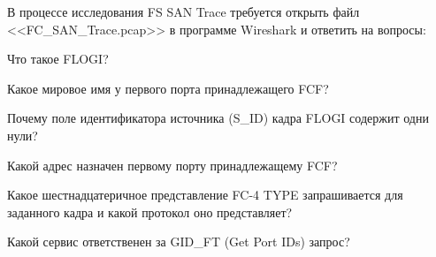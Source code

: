 
В процессе исследования FS SAN Trace требуется открыть файл
<<FC\_SAN\_Trace.pcap>> в программе Wireshark и ответить на вопросы:


\begin{enumerate_num}
    \item Что такое FLOGI?
    \item Какое мировое имя у первого порта принадлежащего FCF?
    \item Почему поле идентификатора источника (S\_ID) кадра FLOGI содержит
    одни нули?
    \item Какой адрес назначен первому порту принадлежащему FCF?
    \item Какое шестнадцатеричное представление FC-4 TYPE запрашивается для
    заданного кадра и какой протокол оно представляет?
    \item Какой сервис ответственен за GID\_FT (Get Port IDs) запрос?
\end{enumerate_num}
